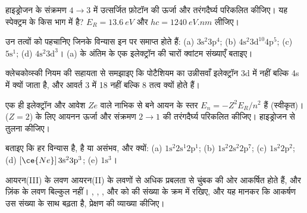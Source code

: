 \begin{exercise}[$\star\star$]\label{exo:b1:quantum-numbers:7}
हाइड्रोजन के संक्रमण $4 \to 3$ में उत्सर्जित फ़ोटॉन की ऊर्जा और तरंगदैर्घ्य
परिकलित कीजिए। यह स्पेक्ट्रम के किस भाग में है?
$E_R = \qty{13.6}{eV}$ और $hc = \qty{1240}{eV.nm}$ लीजिए।
\end{exercise}

\begin{exercise}[$\star\star$]\label{exo:b1:quantum-numbers:8}
उन तत्वों को पहचानिए जिनके  विन्यास इन पर समाप्त होते हैं:
(a) $3\text{s}^2 3\text{p}^4$; (b) $4\text{s}^2 3\text{d}^{10} 4\text{p}^5$;
(c) $5\text{s}^1$; (d) $4\text{s}^2 3\text{d}^3$। (a) के अंतिम  के एक इलेक्ट्रॉन की
चारों क्वांटम संख्याएँ बताइए।
\end{exercise}

\begin{exercise}[$\star\star$]\label{exo:b1:quantum-numbers:9}
क्लेचकोव्स्की नियम की सहायता से समझाइए कि पोटैशियम का उन्नीसवाँ इलेक्ट्रॉन
3d में नहीं बल्कि 4s में क्यों जाता है, और आवर्त 3 में 18 नहीं बल्कि 8
तत्व क्यों होते हैं।
\end{exercise}

\begin{exercise}[$\star\star\star$]\label{exo:b1:quantum-numbers:10}
एक ही इलेक्ट्रॉन और आवेश $Ze$ वाले नाभिक से बने आयन के स्तर
$E_n = -Z^2 E_R/n^2$ हैं (स्वीकृत)।  ($Z = 2$) के लिए
आयनन ऊर्जा और संक्रमण $2 \to 1$ की तरंगदैर्घ्य परिकलित कीजिए।
हाइड्रोजन से तुलना कीजिए।
\end{exercise}

\begin{exercise}[$\star\star\star$]\label{exo:b1:quantum-numbers:11}
बताइए कि हर विन्यास  है,  है या
असंभव, और क्यों: (a) $1\text{s}^2 2\text{s}^1 2\text{p}^1$;
(b) $1\text{s}^2 2\text{s}^2 2\text{p}^7$; (c) $1\text{s}^2 2\text{p}^2$;
(d) $[\ce{Ne}]\,3\text{s}^2 3\text{p}^3$; (e) $1\text{s}^3$।
\end{exercise}

\begin{exercise}[$\star\star\star$]\label{exo:b1:quantum-numbers:12}
आयरन(III) के लवण आयरन(II) के लवणों से अधिक प्रबलता से चुंबक की ओर आकर्षित
होते हैं, और ज़िंक के लवण बिल्कुल नहीं। , ,
,  और  को  की संख्या के क्रम में रखिए, और यह मानकर कि आकर्षण उस संख्या के
साथ बढ़ता है, प्रेक्षण की व्याख्या कीजिए।
\end{exercise}


